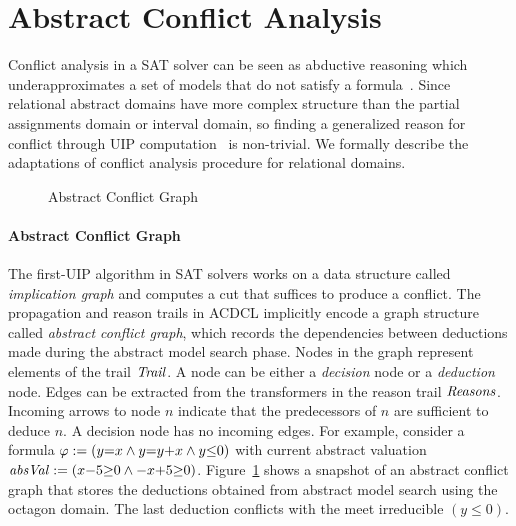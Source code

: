 \section{Abstract Conflict Analysis}
Conflict analysis in a SAT solver can be seen as abductive 
reasoning which underapproximates a set of models that do not satisfy a 
formula~\cite{sas12,dhk2013-popl}.  
Since relational abstract domains have more complex structure than the partial 
assignments domain or interval domain, so finding a generalized reason for 
conflict through UIP computation~\cite{uip} is non-trivial.  We formally 
describe the adaptations of conflict analysis procedure for relational domains. %
\begin{figure}[t]
\caption{\label{conflict} Abstract Conflict Graph }
\end{figure}  

\paragraph {\textbf{Abstract Conflict Graph}}
The first-UIP algorithm in SAT solvers works on a data structure
called {\em implication graph} and computes a cut that suffices to
produce a conflict.  The propagation and reason trails in ACDCL
implicitly encode a graph structure called {\em abstract conflict
  graph}, which records the dependencies between deductions made
during the abstract model search phase.  Nodes in the graph represent
elements of the trail $\mathit{Trail}$.  A node can be either a {\em decision}
node or a {\em deduction} node. Edges can be extracted from the
transformers in the reason trail $\mathit{Reasons}$.  Incoming arrows to node
$n$ indicate that the predecessors of $n$ are sufficient to deduce
$n$.  A decision node has no incoming edges.  For example, consider a
formula $\varphi:= (y{=}x \wedge y{=}y{+}x \wedge y {\leq} 0)$ with
current abstract valuation $\mathit{absVal}:= (x{-}5 {\geq} 0 \wedge {-}x{+}5 {\geq}
0)$.  Figure~\ref{conflict} shows a snapshot of an abstract conflict
graph that stores the deductions obtained from abstract model search
using the octagon domain.  The last deduction conflicts with the
meet irreducible $(y \leq 0)$.


